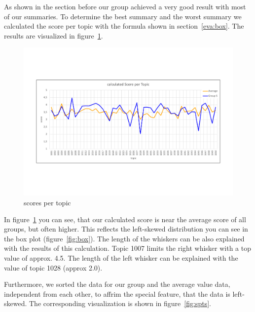 As shown in the section before our group achieved a very good result with most of our summaries.
To determine the best summary and the worst summary we calculated the score per topic with the formula shown in section~\ref{eva:box}. The results are visualized in figure~\ref{fig:spt}.

\begin{figure}[H]
	\centering
	\includegraphics[trim=0 150 0 150, width=\textwidth]{img/score_per_topic.pdf}
	\caption{scores per topic}
	\label{fig:spt}
\end{figure}

In figure~\ref{fig:spt} you can see, that our calculated score is near the average score of all groups, but often higher. This reflects the left-skewed distribution you can see in the box plot (figure~\ref{fig:box}).
The length of the whiskers can be also explained with the results of this calculation.
Topic 1007 limits the right whisker with a top value of approx. 4.5.
The length of the left whisker can be explained with the value of topic 1028 (approx 2.0).

Furthermore, we sorted the data for our group and the average value data, independent from each other, to affrim the special feature, that the data is left-skewed. The corresponding visualization is shown in figure~\ref{fig:spts}.

